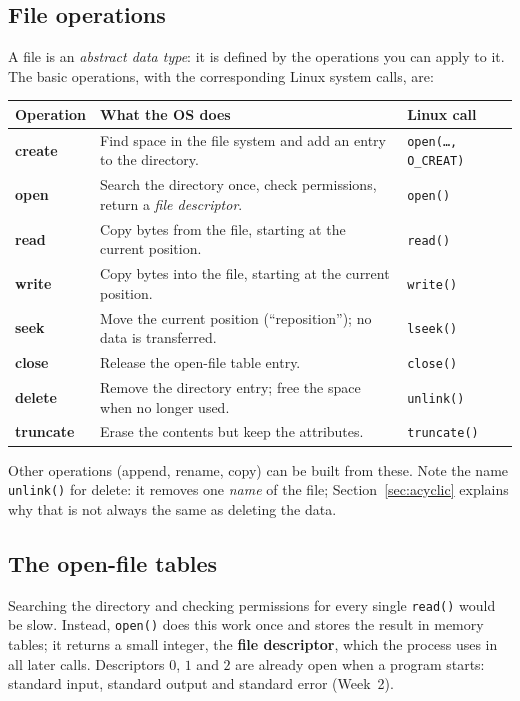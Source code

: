 \documentclass[11pt,a4paper]{article}
\newcommand{\term}[1]{\textbf{\color{mintdeep}#1}}
\newcommand{\cmd}[1]{\texttt{#1}}
\begin{document}
\subsection{File operations}

A file is an \emph{abstract data type}: it is defined by the operations you can apply to it. The basic operations, with the corresponding Linux system calls, are:

\begin{center}
\renewcommand{\arraystretch}{1.25}
\begin{tabularx}{\linewidth}{>{\bfseries}l >{\raggedright\arraybackslash}X l}
\toprule
\textbf{Operation} & \textbf{What the OS does} & \textbf{Linux call} \\
\midrule
create & Find space in the file system and add an entry to the directory. & \cmd{open(\dots, O\_CREAT)} \\
open & Search the directory once, check permissions, return a \emph{file descriptor}. & \cmd{open()} \\
read & Copy bytes from the file, starting at the current position. & \cmd{read()} \\
write & Copy bytes into the file, starting at the current position. & \cmd{write()} \\
seek & Move the current position (``reposition''); no data is transferred. & \cmd{lseek()} \\
close & Release the open-file table entry. & \cmd{close()} \\
delete & Remove the directory entry; free the space when no longer used. & \cmd{unlink()} \\
truncate & Erase the contents but keep the attributes. & \cmd{truncate()} \\
\bottomrule
\end{tabularx}
\end{center}

Other operations (append, rename, copy) can be built from these. Note the name \cmd{unlink()} for delete: it removes one \emph{name} of the file; Section~\ref{sec:acyclic} explains why that is not always the same as deleting the data.

\subsection{The open-file tables}

Searching the directory and checking permissions for every single \cmd{read()} would be slow. Instead, \cmd{open()} does this work once and stores the result in memory tables; it returns a small integer, the \term{file descriptor}, which the process uses in all later calls. Descriptors $0$, $1$ and $2$ are already open when a program starts: standard input, standard output and standard error (Week~2).
\end{document}
